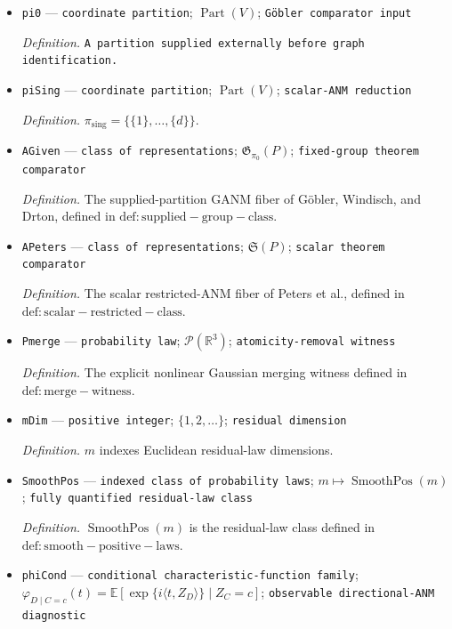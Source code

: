 \documentclass{article}
\begin{document}
\begin{itemize}
  \item \texttt{pi0} --- \texttt{coordinate partition}; \(\operatorname{Part}(V)\); \texttt{Göbler comparator input}
  \par\smallskip\noindent\emph{Definition.} \texttt{A partition supplied externally before graph identification.}
  \item \texttt{piSing} --- \texttt{coordinate partition}; \(\operatorname{Part}(V)\); \texttt{scalar-\allowbreak{}ANM reduction}
  \par\smallskip\noindent\emph{Definition.} \(\pi_{\mathrm{sing}}=\{\{1\},\ldots,\{d\}\}\).
  \item \texttt{AGiven} --- \texttt{class of representations}; \(\mathfrak G_{\pi_0}(P)\); \texttt{fixed-\allowbreak{}group theorem comparator}
  \par\smallskip\noindent\emph{Definition.} The supplied-partition GANM fiber of Göbler, Windisch, and Drton, defined in \(\mathrm{def:supplied-group-class}\).
  \item \texttt{APeters} --- \texttt{class of representations}; \(\mathfrak S(P)\); \texttt{scalar theorem comparator}
  \par\smallskip\noindent\emph{Definition.} The scalar restricted-ANM fiber of Peters et al., defined in \(\mathrm{def:scalar-restricted-class}\).
  \item \texttt{Pmerge} --- \texttt{probability law}; \(\mathcal P(\mathbb R^3)\); \texttt{atomicity-\allowbreak{}removal witness}
  \par\smallskip\noindent\emph{Definition.} The explicit nonlinear Gaussian merging witness defined in \(\mathrm{def:merge-witness}\).
  \item \texttt{mDim} --- \texttt{positive integer}; \(\{1,2,\ldots\}\); \texttt{residual dimension}
  \par\smallskip\noindent\emph{Definition.} \(m\) indexes Euclidean residual-law dimensions.
  \item \texttt{SmoothPos} --- \texttt{indexed class of probability laws}; \(m\mapsto\operatorname{SmoothPos}(m)\); \texttt{fully quantified residual-\allowbreak{}law class}
  \par\smallskip\noindent\emph{Definition.} \(\operatorname{SmoothPos}(m)\) is the residual-law class defined in \(\mathrm{def:smooth-positive-laws}\).
  \item \texttt{phiCond} --- \texttt{conditional characteristic-\allowbreak{}function family}; \(\varphi_{D\mid C=c}(t)=\mathbb E[\exp\{i\langle t,Z_D\rangle\}\mid Z_C=c]\); \texttt{observable directional-\allowbreak{}ANM diagnostic}

\end{itemize}
\end{document}
